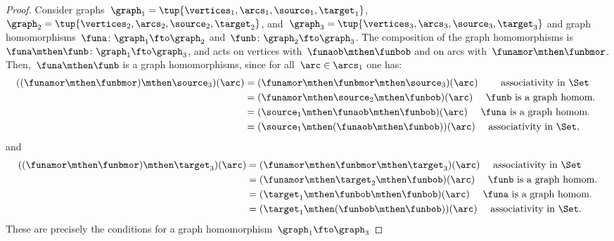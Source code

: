 \begin{proof}
    Consider graphs~$\graph_1=\tup{\vertices_1,\arcs_1,\source_1,\target_1}$,~$\graph_2=\tup{\vertices_2,\arcs_2,\source_2,\target_2}$, and~$\graph_3=\tup{\vertices_3,\arcs_3,\source_3,\target_3}$ and
    graph homomorphisms~$\funa \colon \graph_1 \fto \graph_2$ and~$\funb \colon \graph_2 \fto \graph_3$.
    The composition of the graph homomorphisms is~$\funa\mthen \funb \colon \graph_1 \fto \graph_3$, and acts on vertices with~$\funaob \mthen \funbob$ and on arcs with~$\funamor \mthen \funbmor$.
    Then,~$\funa\mthen \funb$ is a graph homomorphisms, since for all~$\arc \in \arcs_1$ one has:
    \begin{equation*}
        \begin{aligned}
            ((\funamor\mthen \funbmor) \mthen \source_3)(\arc) & =(\funamor\mthen \funbmor \mthen \source_3)(\arc) \qquad \text{ associativity in \Set} \\
                                                               & =(\funamor\mthen \source_2 \mthen \funbob)(\arc) \quad \text{ $\funb$ is a graph homom.
            } \\
                                                               & =(\source_1 \mthen \funaob\mthen \funbob)(\arc) \quad \text{ $\funa$ is a graph homom.} \\
                                                               & =(\source_1 \mthen (\funaob\mthen \funbob))(\arc) \quad \text{ associativity in \Set},
        \end{aligned}
    \end{equation*}
    and
    \begin{equation*}
        \begin{aligned}
            ((\funamor \mthen \funbmor) \mthen \target_3)(\arc) & =(\funamor \mthen \funbmor \mthen \target_3)(\arc) \quad \text{ associativity in \Set} \\
                                                                & =(\funamor \mthen \target_2\mthen \funbob)(\arc) \quad \text{ $\funb$ is a graph homom.} \\
                                                                & =(\target_1 \mthen \funbob\mthen \funbob)(\arc)\quad \text{ $\funa$ is a graph homom.} \\
                                                                & =(\target_1 \mthen (\funbob\mthen \funbob))(\arc)\quad \text{ associativity in \Set}.
        \end{aligned}
    \end{equation*}
    These are precisely the conditions for a graph homomorphism~$\graph_1 \fto \graph_3$
\end{proof}
